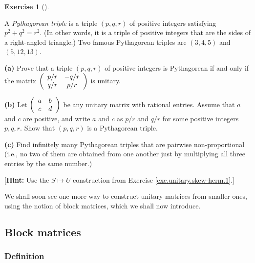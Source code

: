 \documentclass[numbers=enddot,12pt,final,onecolumn,notitlepage]{scrartcl}%
\newcounter{exer}
\numberwithin{exer}{subsection}
\theoremstyle{definition}
\newtheorem{exmp}[exer]{Exercise}
\newenvironment{exercise}[1][]
{\begin{exmp}[#1]\begin{leftbar}}
{\end{leftbar}\end{exmp}}
\begin{document}
\begin{exercise}
\label{exe.unitary.skew-herm.pyth} A \emph{Pythagorean triple} is a
triple $\left(  p,q,r\right)  $ of positive integers satisfying $p^{2}%
+q^{2}=r^{2}$. (In other words, it is a triple of positive integers that are
the sides of a right-angled triangle.) Two famous Pythagorean triples are
$\left(  3,4,5\right)  $ and $\left(  5,12,13\right)  $. \medskip

\textbf{(a)} Prove that a triple $\left(  p,q,r\right)  $ of positive integers
is Pythagorean if and only if the matrix $\left(
\begin{array}
[c]{cc}%
p/r & -q/r\\
q/r & p/r
\end{array}
\right)  $ is unitary. \medskip

\textbf{(b)} Let $\left(
\begin{array}
[c]{cc}%
a & b\\
c & d
\end{array}
\right)  $ be any unitary matrix with rational entries. Assume that $a$ and
$c$ are positive, and write $a$ and $c$ as $p/r$ and $q/r$ for some positive
integers $p,q,r$. Show that $\left(  p,q,r\right)  $ is a Pythagorean triple.
\medskip

\textbf{(c)} Find infinitely many Pythagorean triples that are pairwise
non-proportional (i.e., no two of them are obtained from one another just by
multiplying all three entries by the same number.) \medskip

[\textbf{Hint:} Use the $S\mapsto U$ construction from Exercise
\ref{exe.unitary.skew-herm.1}.]
\end{exercise}

We shall soon see one more way to construct unitary matrices from smaller
ones, using the notion of block matrices, which we shall now introduce.

\subsection{Block matrices}

\subsubsection{Definition}
\end{document}
